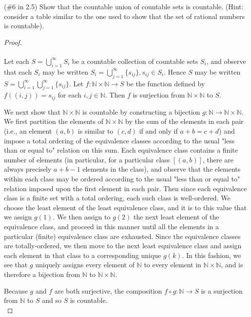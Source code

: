 (\#6 in 2.5) Show that the countable union of countable sets is countable. (Hint: consider a table similar to the one 
used to show that the set of rational numbers is countable).

\begin{proof}\ \\\\
    Let each $S = \bigcup\limits_{i=1}^{\infty}{S_i}$ be a countable collection of countable sets $S_i$, and observe
    that each $S_i$ may be written $S_i = \bigcup\limits_{j=1}^{\infty}{\{s_{ij}\}}, s_{ij} \in S_i$.  Hence $S$ may be
    written $S = \bigcup\limits_{i=1}^{\infty}\bigcup\limits_{j=1}^{\infty}{\{s_{ij}\}}$. Let 
    $f: \mathbb{N} \times \mathbb{N} \to S$ be the function defined by $f((i, j)) = s_{ij}$ for each 
    $i,j \in \mathbb{N}$. Then $f$ is surjection from $\mathbb{N} \times \mathbb{N}$ to $S$. 

    We next show that $\mathbb{N} \times \mathbb{N}$ is countable by constructing a bijection
    $g:\mathbb{N} \to \mathbb{N} \times \mathbb{N} $. We first partition the elements of $\mathbb{N} \times \mathbb{N}$ 
    by the sum of the elements in each pair (i.e., an element $(a, b)$ is similar to $(c, d)$ if and only if 
    $a + b = c + d$) and impose a total ordering of the equivalence classes according to the usual "less than or equal
    to" relation on this sum. Each equivalence class contains a finite number of elements (in particular, for a 
    particular class $[(a, b)]$, there are always precisely $a + b - 1$ elements in the class), and observe that the
    elements within each class may be ordered according to the usual "less than or equal to" relation imposed upon the
    first element in each pair. Then since each equivalence class is a finite set with a total ordering, each such 
    class is well-ordered. We choose the least element of the least equivalence class, and it is to this value that we
    assign $g(1)$. We then assign to $g(2)$ the next least element of the equivalence class, and proceed in this manner
    until all the elements in a particular (finite) equivalence class are exhausted. Since the equivalence classes are
    totally-ordered, we then move to the next least equivalence class and assign each element in that class to a 
    corresponding unique $g(k)$. In this fashion, we see that $g$ uniquely assigns every element of $\mathbb{N}$ 
    to every element in $\mathbb{N} \times \mathbb{N}$, and is therefore a bijection from $\mathbb{N}$ to 
    $\mathbb{N} \times \mathbb{N}$. 
   
    Because $g$ and $f$ are both surjective, the composition $f \circ g:\mathbb{N} \to S$ is a surjection from 
    $\mathbb{N}$ to $S$ and so $S$ is countable.
    \ \\
\end{proof}